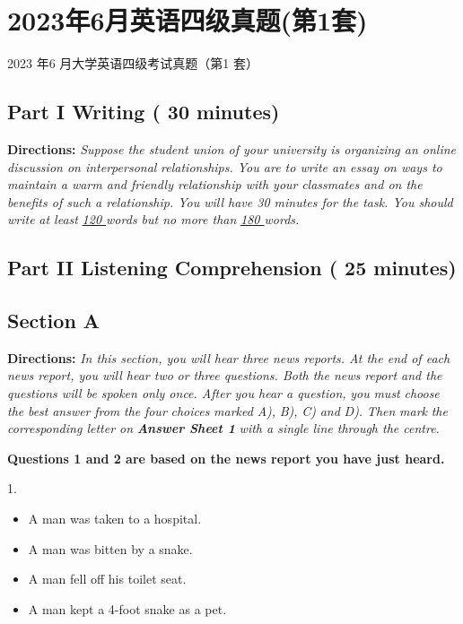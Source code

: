 \documentclass[UTF8,11pt]{ctexart}
\begin{document}
\section*{2023年6月英语四级真题(第1套)}
2023 年6 月大学英语四级考试真题（第1 套）


\subsection*{\textbf{Part I Writing} \textbf{( 30 minutes)}}


\textbf{Directions:} \textit{Suppose the student union of your university is organizing an online discussion on interpersonal} \textit{relationships. You are to write an essay on ways to maintain a warm and friendly relationship with your} \textit{classmates and on the benefits of such a relationship. You will have 30 minutes for the task. You should write} \textit{at least }\textit{\uline{120 }}\textit{words but no more than }\textit{\uline{180 }}\textit{words.}


\subsection*{\textbf{Part II} \textbf{Listening Comprehension} \textbf{( 25 minutes)}}


\subsection*{\textbf{Section A}}


\textbf{Directions:} \textit{In this section, you will hear three news reports. At the end of each news report, you will hear two} \textit{or three questions. Both the news report and the questions will be spoken only once. After you hear a question,} \textit{you} \textit{must} \textit{choose} \textit{the} \textit{best} \textit{answer} \textit{from} \textit{the} \textit{four} \textit{choices} \textit{marked} \textit{A),} \textit{B),} \textit{C)} \textit{and} \textit{D).} \textit{Then} \textit{mark} \textit{the} \textit{corresponding letter on }\textbf{\textit{Answer Sheet 1}}\textit{ with a single line through the centre.}


\textbf{Questions 1 and 2 are based on the news report you have just heard.}


1.


\begin{itemize}[leftmargin=2em,itemsep=.2em,topsep=.4em]\item[A.] A man was taken to a hospital.
\item[B.] A man was bitten by a snake.
\item[C.] A man fell off his toilet seat.
\item[D.] A man kept a 4-foot snake as a pet.
\end{itemize}
\end{document}
